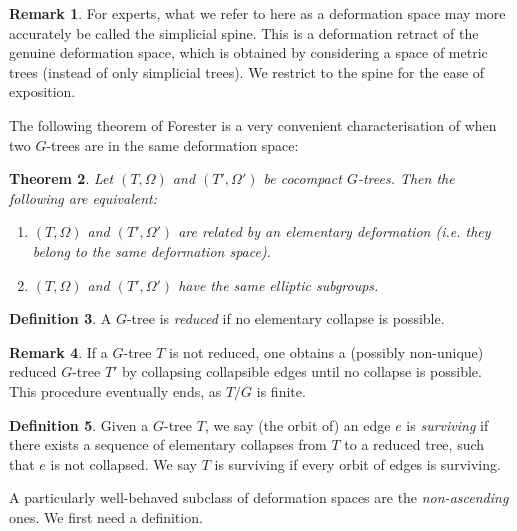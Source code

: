 \documentclass[svgnames]{amsart}
\theoremstyle{plain}
\newtheorem{thm}{Theorem}[section]
\theoremstyle{definition}
\newtheorem{defn}[thm]{Definition}
\newtheorem{rem}[thm]{Remark}
\begin{document}
\begin{rem}
For experts, what we refer to here as a deformation space may more accurately be called the simplicial spine. This is a deformation retract of the genuine deformation space, which is obtained by considering a space of metric trees (instead of only simplicial trees). We restrict to the spine for the ease of exposition.
\end{rem}

\noindent The following theorem of Forester is a very convenient characterisation of when two $G$-trees are in the same deformation space:

\begin{thm}\cite[Theorem 1.1]{forester}\label{thm:forester}
    Let $(T, \Omega)$ and $(T', \Omega')$ be cocompact $G$-trees. Then the following are equivalent:
    \begin{enumerate}
        \item $(T, \Omega)$ and $(T', \Omega')$ are related by an elementary deformation (i.e. they belong to the same deformation space).
        \item $(T, \Omega)$ and $(T', \Omega')$ have the same elliptic subgroups.
    \end{enumerate}
\end{thm}






\begin{defn}
    A $G$-tree is \emph{reduced} if no elementary collapse is possible.
\end{defn}

\begin{rem}\label{rem:reduced JSJ tree}
    If a $G$-tree $T$ is not reduced, one obtains a (possibly non-unique) reduced $G$-tree $T'$ by collapsing collapsible edges until no collapse is possible. This procedure eventually ends, as $T/G$ is finite.
\end{rem}

\begin{defn}
    Given a $G$-tree $T$, we say (the orbit of) an edge $e$ is \emph{surviving} if there exists a sequence of elementary collapses from $T$ to a reduced tree, such that $e$ is not collapsed. We say $T$ is surviving if every orbit of edges is surviving.
\end{defn}



\noindent A particularly well-behaved subclass of deformation spaces are the \emph{non-ascending} ones. We first need a definition.
\end{document}

